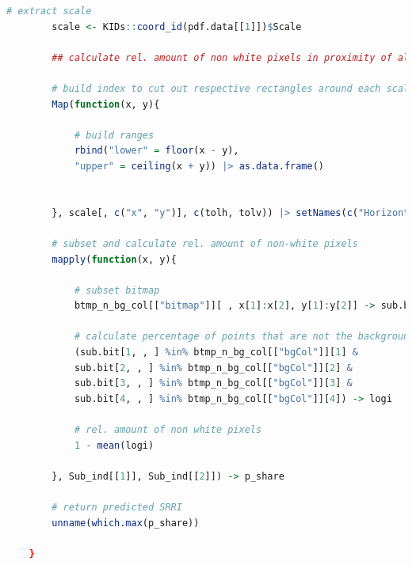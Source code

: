 \documentclass[aodsor,preprint]{imsart}
\numberwithin{equation}{section}
\theoremstyle{plain}
\begin{document}
\begin{lstlisting}[language = R, basicstyle = \tiny]
		# extract scale
		scale <- KIDs::coord_id(pdf.data[[1]])$Scale
		
		## calculate rel. amount of non white pixels in proximity of all scale entries ##
		
		# build index to cut out respective rectangles around each scale point
		Map(function(x, y){
			
			# build ranges
			rbind("lower" = floor(x - y),
			"upper" = ceiling(x + y)) |> as.data.frame()
			
			
		}, scale[, c("x", "y")], c(tolh, tolv)) |> setNames(c("Horizontal", "Vertical")) -> Sub_ind
		
		# subset and calculate rel. amount of non-white pixels
		mapply(function(x, y){
			
			# subset bitmap
			btmp_n_bg_col[["bitmap"]][ , x[1]:x[2], y[1]:y[2]] -> sub.bit
			
			# calculate percentage of points that are not the background color
			(sub.bit[1, , ] %in% btmp_n_bg_col[["bgCol"]][1] &
			sub.bit[2, , ] %in% btmp_n_bg_col[["bgCol"]][2] &
			sub.bit[3, , ] %in% btmp_n_bg_col[["bgCol"]][3] &
			sub.bit[4, , ] %in% btmp_n_bg_col[["bgCol"]][4]) -> logi
			
			# rel. amount of non white pixels
			1 - mean(logi)
			
		}, Sub_ind[[1]], Sub_ind[[2]]) -> p_share
		
		# return predicted SRRI
		unname(which.max(p_share))
		
	}

\end{lstlisting}




\newpage
\printbibliography
\end{document}
